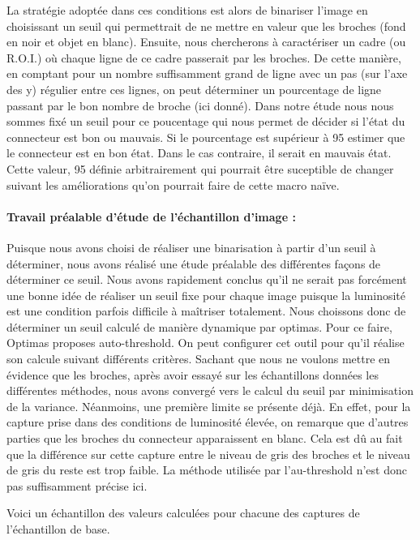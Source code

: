 \documentclass{scrreprt}
\begin{document}
La stratégie adoptée dans ces conditions est alors de binariser l'image en choisissant un seuil qui permettrait
de ne mettre en valeur que les broches (fond en noir et objet en blanc). Ensuite, nous chercherons à caractériser un
cadre (ou R.O.I.) où chaque ligne de ce cadre passerait par les broches. De cette manière, en comptant pour un nombre
suffisamment grand de ligne avec un pas (sur l'axe des y) régulier entre ces lignes, on peut déterminer un pourcentage
de ligne passant par le bon nombre de broche (ici donné). Dans notre étude nous nous sommes fixé un seuil pour ce poucentage
qui nous permet de décider si l'état du connecteur est bon ou mauvais. Si le pourcentage est supérieur à 95%
estimer que le connecteur est en bon état. Dans le cas contraire, il serait en mauvais état. Cette valeur, 95%
définie arbitrairement qui pourrait être suceptible de changer suivant les améliorations qu'on pourrait faire de cette macro 
naïve.   

\paragraph{Travail préalable d'étude de l'échantillon d'image : }
Puisque nous avons choisi de réaliser une binarisation à partir d'un seuil à déterminer, nous avons réalisé 
une étude préalable des différentes façons de déterminer ce seuil. Nous avons rapidement conclus qu'il ne serait
pas forcément une bonne idée de réaliser un seuil fixe pour chaque image puisque la luminosité est une condition 
parfois difficile à maîtriser totalement. Nous choissons donc de déterminer un seuil calculé de manière dynamique
par optimas. Pour ce faire, Optimas proposes auto-threshold. On peut configurer cet outil pour qu'il réalise son 
calcule suivant différents critères. Sachant que nous ne voulons mettre en évidence que les broches, après avoir
essayé sur les échantillons données les différentes méthodes, nous avons convergé vers le calcul du seuil par 
minimisation de la variance. Néanmoins, une première limite se présente déjà. En effet, pour la capture prise 
dans des conditions de luminosité élevée, on remarque que d'autres parties que les broches du connecteur apparaissent
en blanc. Cela est dû au fait que la différence sur cette capture entre le niveau de gris des broches et le niveau de
gris du reste est trop faible. La méthode utilisée par l'au-threshold n'est donc pas suffisamment précise ici. 

Voici un échantillon des valeurs calculées pour chacune des captures de l'échantillon de base. 
\end{document}
